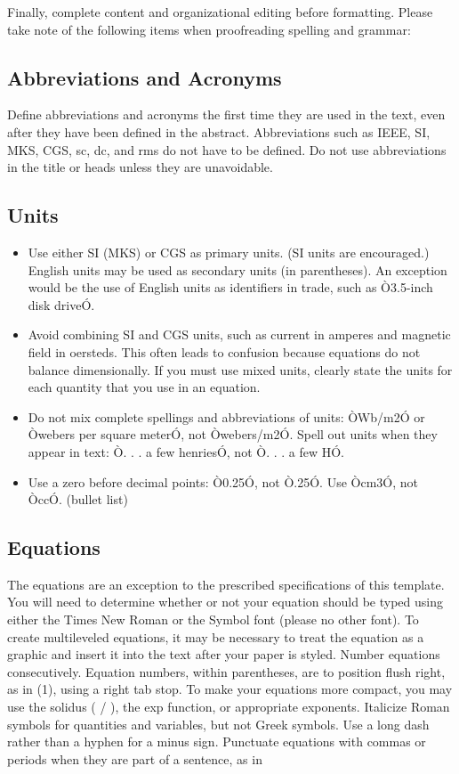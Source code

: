 \documentclass[a4paper, 10pt, conference]{ieeeconf}
\begin{document}
Finally, complete content and organizational editing before formatting. Please take note of the following items when proofreading spelling and grammar:

\subsection{Abbreviations and Acronyms} Define abbreviations and acronyms the first time they are used in the text, even after they have been defined in the abstract. Abbreviations such as IEEE, SI, MKS, CGS, sc, dc, and rms do not have to be defined. Do not use abbreviations in the title or heads unless they are unavoidable.

\subsection{Units}

\begin{itemize}

\item Use either SI (MKS) or CGS as primary units. (SI units are encouraged.) English units may be used as secondary units (in parentheses). An exception would be the use of English units as identifiers in trade, such as Ò3.5-inch disk driveÓ.
\item Avoid combining SI and CGS units, such as current in amperes and magnetic field in oersteds. This often leads to confusion because equations do not balance dimensionally. If you must use mixed units, clearly state the units for each quantity that you use in an equation.
\item Do not mix complete spellings and abbreviations of units: ÒWb/m2Ó or Òwebers per square meterÓ, not Òwebers/m2Ó.  Spell out units when they appear in text: Ò. . . a few henriesÓ, not Ò. . . a few HÓ.
\item Use a zero before decimal points: Ò0.25Ó, not Ò.25Ó. Use Òcm3Ó, not ÒccÓ. (bullet list)

\end{itemize}


\subsection{Equations}

The equations are an exception to the prescribed specifications of this template. You will need to determine whether or not your equation should be typed using either the Times New Roman or the Symbol font (please no other font). To create multileveled equations, it may be necessary to treat the equation as a graphic and insert it into the text after your paper is styled. Number equations consecutively. Equation numbers, within parentheses, are to position flush right, as in (1), using a right tab stop. To make your equations more compact, you may use the solidus ( / ), the exp function, or appropriate exponents. Italicize Roman symbols for quantities and variables, but not Greek symbols. Use a long dash rather than a hyphen for a minus sign. Punctuate equations with commas or periods when they are part of a sentence, as in
\end{document}

